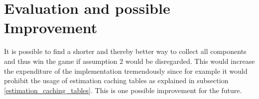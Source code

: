 \documentclass{article}
\begin{document}
\section{Evaluation and possible Improvement}
It is possible to find a shorter and thereby better way to collect all components and thus win the game if assumption 2 would be disregarded. 
This would increase the expenditure of the implementation tremendously since for example it would prohibit the usage of estimation caching tables as explained in subsection \ref{estimation_caching_tables}. This is one possible improvement for the future.\\
\end{document}

